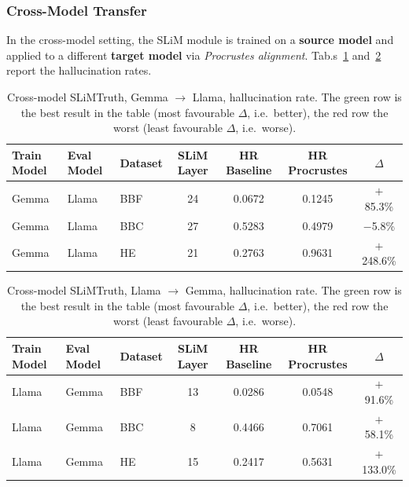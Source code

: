 \subsubsection{Cross-Model Transfer}

In the cross-model setting, the SLiM module is trained on a \textbf{source model} and applied to a different \textbf{target model} via \textit{Procrustes alignment}. Tab.s~\ref{tab:slim-cross-model-gemma-to-llama} and~\ref{tab:slim-cross-model-llama-to-gemma} report the hallucination rates.

\begin{table}[H]
\centering
\small
\setlength{\tabcolsep}{3pt}
\begin{tabular}{lllcccc}
\toprule
\textbf{Train Model} & \textbf{Eval Model} & \textbf{Dataset} & \textbf{SLiM Layer} & \textbf{HR Baseline} & \textbf{HR Procrustes} & \textbf{$\Delta$} \\
\midrule
Gemma & Llama & BBF & 24 & 0.0672 & 0.1245 & $+$85.3\% \\
\rowcolor{green!25}Gemma & Llama & BBC & 27 & 0.5283 & 0.4979 & $-$5.8\% \\
\rowcolor{red!25}Gemma & Llama & HE  & 21 & 0.2763 & 0.9631 & $+$248.6\% \\
\bottomrule
\end{tabular}
\caption{Cross-model SLiMTruth, Gemma $\to$ Llama, hallucination rate. The green row is the best result in the table (most favourable $\Delta$, i.e.\ better), the red row the worst (least favourable $\Delta$, i.e.\ worse).}
\label{tab:slim-cross-model-gemma-to-llama}
\end{table}

\begin{table}[H]
\centering
\small
\setlength{\tabcolsep}{3pt}
\begin{tabular}{lllcccc}
\toprule
\textbf{Train Model} & \textbf{Eval Model} & \textbf{Dataset} & \textbf{SLiM Layer} & \textbf{HR Baseline} & \textbf{HR Procrustes} & \textbf{$\Delta$} \\
\midrule
Llama & Gemma & BBF & 13 & 0.0286 & 0.0548 & $+$91.6\% \\
\rowcolor{green!25}Llama & Gemma & BBC & 8  & 0.4466 & 0.7061 & $+$58.1\% \\
\rowcolor{red!25}Llama & Gemma & HE  & 15 & 0.2417 & 0.5631 & $+$133.0\% \\
\bottomrule
\end{tabular}
\caption{Cross-model SLiMTruth, Llama $\to$ Gemma, hallucination rate. The green row is the best result in the table (most favourable $\Delta$, i.e.\ better), the red row the worst (least favourable $\Delta$, i.e.\ worse).}
\label{tab:slim-cross-model-llama-to-gemma}
\end{table}

